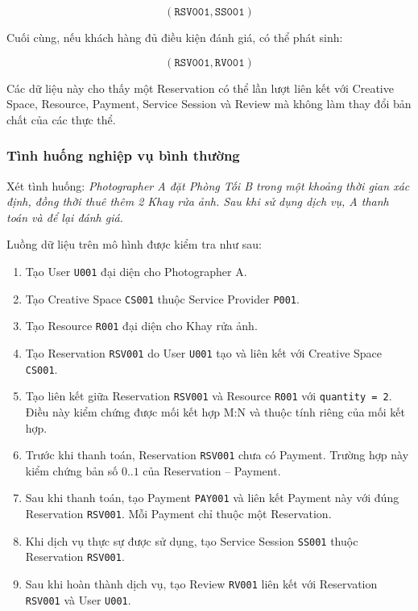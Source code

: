 $$
(\texttt{RSV001},\texttt{SS001})
$$

Cuối cùng, nếu khách hàng đủ điều kiện đánh giá, có thể phát sinh:

$$
(\texttt{RSV001},\texttt{RV001})
$$

Các dữ liệu này cho thấy một Reservation có thể lần lượt liên kết với Creative Space, Resource, Payment, Service Session và Review mà không làm thay đổi bản chất của các thực thể.

\subsubsection{Tình huống nghiệp vụ bình thường}

Xét tình huống: \textit{Photographer A đặt Phòng Tối B trong một khoảng thời gian xác định, đồng thời thuê thêm 2 Khay rửa ảnh. Sau khi sử dụng dịch vụ, A thanh toán và để lại đánh giá.}

Luồng dữ liệu trên mô hình được kiểm tra như sau:

\begin{enumerate}

\item Tạo User \texttt{U001} đại diện cho Photographer A.

\item Tạo Creative Space \texttt{CS001} thuộc Service Provider \texttt{P001}.

\item Tạo Resource \texttt{R001} đại diện cho Khay rửa ảnh.

\item Tạo Reservation \texttt{RSV001} do User \texttt{U001} tạo và liên kết với Creative Space \texttt{CS001}.

\item Tạo liên kết giữa Reservation \texttt{RSV001} và Resource \texttt{R001} với \texttt{quantity = 2}. Điều này kiểm chứng được mối kết hợp M:N và thuộc tính riêng của mối kết hợp.

\item Trước khi thanh toán, Reservation \texttt{RSV001} chưa có Payment. Trường hợp này kiểm chứng bản số $0..1$ của Reservation -- Payment.

\item Sau khi thanh toán, tạo Payment \texttt{PAY001} và liên kết Payment này với đúng Reservation \texttt{RSV001}. Mỗi Payment chỉ thuộc một Reservation.

\item Khi dịch vụ thực sự được sử dụng, tạo Service Session \texttt{SS001} thuộc Reservation \texttt{RSV001}.

\item Sau khi hoàn thành dịch vụ, tạo Review \texttt{RV001} liên kết với Reservation \texttt{RSV001} và User \texttt{U001}.

\end{enumerate}

